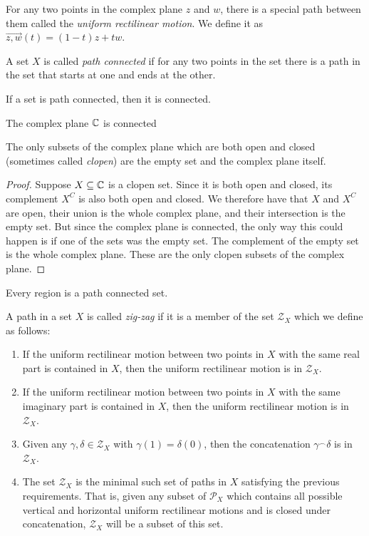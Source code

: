 \begin{definition}
For any two points in the complex plane $z$ and $w$, there is a special path between them called the \emph{uniform rectilinear motion}. We define it as $\overrightarrow{z,w}(t)=(1-t)z+tw$.
\end{definition}
\begin{definition}
A set $X$ is called \emph{path connected} if for any two points in the set there is a path in the set that starts at one and ends at the other.
\end{definition}
\begin{theorem}
If a set is path connected, then it is connected.
\end{theorem}
\begin{corollary}
The complex plane $\mathbb{C}$ is connected
\end{corollary}
\begin{corollary}
The only subsets of the complex plane which are both open and closed (sometimes called \emph{clopen}) are the empty set and the complex plane itself.
\end{corollary}
\begin{proof}
Suppose $X \subseteq \mathbb{C}$ is a clopen set. Since it is both open and closed, its complement $X^C$ is also both open and closed. We therefore have that $X$ and $X^C$ are open, their union is the whole complex plane, and their intersection is the empty set. But since the complex plane is connected, the only way this could happen is if one of the sets was the empty set. The complement of the empty set is the whole complex plane.
These are the only clopen subsets of the complex plane.
\end{proof}
\begin{theorem}
Every region is a path connected set.
\end{theorem}
\begin{definition}
A path in a set $X$ is called \emph{zig-zag} if it is a member of the set $\mathcal{Z}_X$ which we define as follows:
\begin{enumerate}
\item If the uniform rectilinear motion between two points in $X$ with the same real part is contained in $X$, then the uniform rectilinear motion is in $\mathcal{Z}_X$.
\item If the uniform rectilinear motion between two points in $X$ with the same imaginary part is contained in $X$, then the uniform rectilinear motion is in $\mathcal{Z}_X$.
\item Given any $\gamma, \delta \in \mathcal{Z}_X$ with $\gamma(1)=\delta(0)$, then the concatenation $\gamma^\frown\delta$ is in $\mathcal{Z}_X$.
\item The set $\mathcal{Z}_X$ is the minimal such set of paths in $X$ satisfying the previous requirements. That is, given any subset of $\mathcal{P}_X$ which contains all possible vertical and horizontal uniform rectilinear motions and is closed under concatenation, $\mathcal{Z}_X$ will be a subset of this set.
\end{enumerate}
\end{definition}
